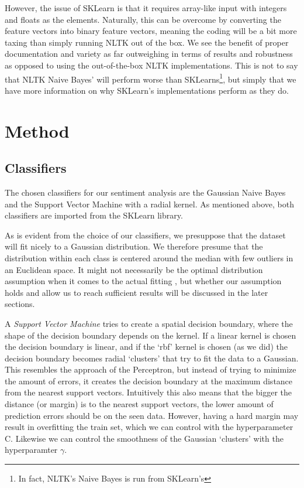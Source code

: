 \documentclass{article}
\begin{document}
However, the issue of SKLearn is that it requires array-like input with integers and floats as the elements. Naturally, this can be overcome by converting the feature vectors into binary feature vectors, meaning the coding will be a bit more taxing than simply running NLTK out of the box. We see the benefit of proper documentation and variety as far outweighing in terms of results and robustness as opposed to using the out-of-the-box NLTK implementations. This is not to say that NLTK Naive Bayes' will perform worse than SKLearns\footnote{In fact, NLTK's Naive Bayes is run from SKLearn's}, but simply that we have more information on why SKLearn's implementations perform as they do.

\section{Method}
\subsection{Classifiers}
The chosen classifiers for our sentiment analysis are the Gaussian Naive Bayes and the Support Vector Machine with a radial kernel. As mentioned above, both classifiers are imported from the SKLearn library\cite{web:sklearn}.

As is evident from the choice of our classifiers, we presuppose that the dataset will fit nicely to a Gaussian distribution. We therefore presume that the distribution within each class is centered around the median with few outliers in an Euclidean space. It might not necessarily be the optimal distribution assumption when it comes to the actual fitting , but whether our assumption holds and allow us to reach sufficient results will be discussed in the later sections.

A \textit{ Support Vector Machine} tries to create a spatial decision boundary, where the shape of the decision boundary depends on the kernel. If a linear kernel is chosen the decision boundary is linear, and if the `rbf' kernel is chosen (as we did) the decision boundary becomes radial `clusters' that try to fit the data to a Gaussian. 
This resembles the approach of the Perceptron, but instead of trying to minimize the amount of errors, it creates the decision boundary at the maximum distance from the nearest support vectors. Intuitively this also means that the bigger the distance (or margin) is to the nearest support vectors, the lower amount of prediction errors should be on the seen data.
However, having a hard margin may result in overfitting the train set, which we can control with the hyperparameter C. Likewise we can control the smoothness of the Gaussian `clusters' with the hyperparamter $\gamma$. 
\end{document}
